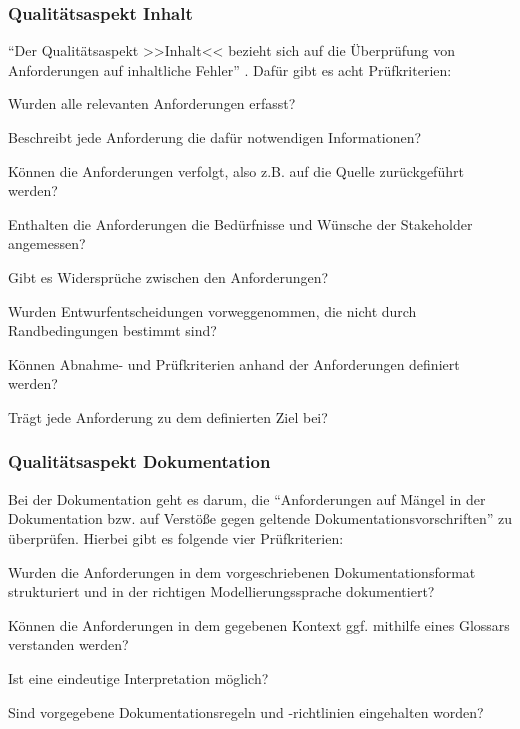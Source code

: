 \documentclass [12pt, a4paper, oneside, titlepage, ngerman]{article}
\begin{document}
\subsubsection{Qualitätsaspekt Inhalt}
"`Der Qualitätsaspekt >>Inhalt<< bezieht sich auf die Überprüfung von Anforderungen auf inhaltliche Fehler"' \cite[S.98]{PohlRupp2015}. Dafür gibt es acht Prüfkriterien\cite[vgl.][S.98]{PohlRupp2015}: 
\begin{description}[font=\itshape]\setlength\itemsep{0em}
\item[Vollständigkeit:] Wurden alle relevanten Anforderungen erfasst?
\item[Korrektheit:] Beschreibt jede Anforderung die dafür notwendigen Informationen?
\item[Verfolgbarkeit:] Können die Anforderungen verfolgt, also z.B. auf die Quelle zurückgeführt werden?
\item[Adäquatheit:] Enthalten die Anforderungen die Bedürfnisse und Wünsche der Stakeholder angemessen?
\item[Konsistenz:] Gibt es Widersprüche zwischen den Anforderungen?
\item[Vorzeitige Entwurfsentscheidungen:] Wurden Entwurfentscheidungen vorweggenommen, die nicht durch Randbedingungen bestimmt sind?
\item[Überprüfbarkeit:] Können Abnahme- und Prüfkriterien anhand der Anforderungen definiert werden?
\item[Notwendigkeit:] Trägt jede Anforderung zu dem definierten Ziel bei?
\end{description}

\subsubsection{Qualitätsaspekt Dokumentation}
Bei der Dokumentation geht es darum, die "`Anforderungen auf Mängel in der Dokumentation bzw. auf Verstöße gegen geltende Dokumentationsvorschriften"'\cite[S.99]{PohlRupp2015} zu überprüfen. Hierbei gibt es folgende vier Prüfkriterien\cite[vgl.][S.99f.]{PohlRupp2015}:
\begin{description}[font=\itshape]\setlength\itemsep{0em}
\item[Konformität:] Wurden die Anforderungen in dem vorgeschriebenen Dokumentationsformat strukturiert und in der richtigen Modellierungssprache dokumentiert?
\item[Verständlichkeit:] Können die Anforderungen in dem gegebenen Kontext ggf. mithilfe eines Glossars verstanden werden?
\item[Eindeutigkeit:] Ist eine eindeutige Interpretation möglich?
\item[Konfirmität mit Dokumentationsregeln:] Sind vorgegebene Dokumentationsregeln und -richtlinien eingehalten worden?
\end{description}
\end{document}
